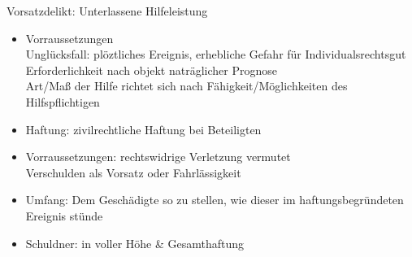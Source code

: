 \begin{hintbox}{Vorsatzdelikt: Unterlassene Hilfeleistung}
    \begin{itemize}
        \item Vorraussetzungen\\
        \ra Unglücksfall: plöztliches Ereignis, erhebliche Gefahr für Individualsrechtsgut\\
        \ra Erforderlichkeit nach objekt naträglicher Prognose\\
        \ra Art/Maß der Hilfe richtet sich nach Fähigkeit/Möglichkeiten des Hilfspflichtigen
        \item Haftung: zivilrechtliche Haftung bei Beteiligten
        \item Vorraussetzungen: rechtswidrige Verletzung vermutet\\
        \ra Verschulden als Vorsatz oder Fahrlässigkeit
        \item Umfang: Dem Geschädigte so zu stellen, wie dieser im haftungsbegründeten Ereignis stünde
        \item Schuldner: in voller Höhe \& Gesamthaftung  
    \end{itemize}
\end{hintbox}
